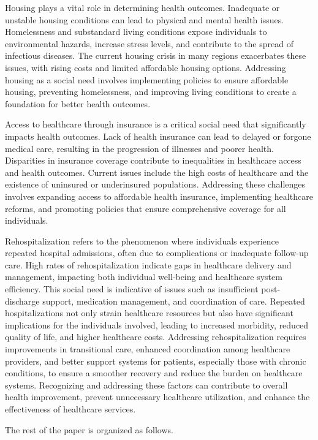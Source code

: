 \documentclass[12pt]{article}
\begin{document}
Housing plays a vital role in determining
health outcomes. Inadequate or unstable
housing conditions can lead to physical
and mental health issues. Homelessness
and substandard living conditions expose
individuals to environmental hazards,
increase stress levels, and contribute
to the spread of infectious diseases.
The current housing crisis in many regions
exacerbates these issues, with rising
costs and limited affordable housing
options. Addressing housing as a social
need involves implementing policies to
ensure affordable housing, preventing
homelessness, and improving living
conditions to create a foundation for
better health outcomes.

Access to healthcare through insurance
is a critical social need that significantly
impacts health outcomes. Lack of health
insurance can lead to delayed or forgone
medical care, resulting in the progression
of illnesses and poorer health.
Disparities in insurance coverage contribute
to inequalities in healthcare access and
health outcomes. Current issues include
the high costs of healthcare and the
existence of uninsured or underinsured
populations. Addressing these challenges
involves expanding access to affordable
health insurance, implementing healthcare
reforms, and promoting policies that
ensure comprehensive coverage for all
individuals.

Rehospitalization refers to the phenomenon
where individuals experience repeated
hospital admissions, often due to
complications or inadequate follow-up care.
High rates of rehospitalization indicate
gaps in healthcare delivery and management,
impacting both individual well-being and
healthcare system efficiency. This social
need is indicative of issues such as
insufficient post-discharge support,
medication management, and coordination
of care. Repeated hospitalizations not
only strain healthcare resources but also
have significant implications for the
individuals involved, leading to increased
morbidity, reduced quality of life, and
higher healthcare costs. Addressing
rehospitalization requires improvements
in transitional care, enhanced coordination
among healthcare providers, and better
support systems for patients, especially
those with chronic conditions, to ensure
a smoother recovery and reduce the burden
on healthcare systems. Recognizing and
addressing these factors can contribute
to overall health improvement, prevent
unnecessary healthcare utilization, and
enhance the effectiveness of healthcare
services.

The rest of the paper is organized as follows.
\end{document}

